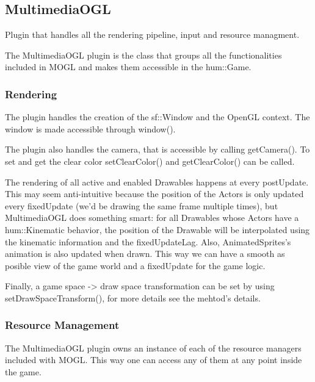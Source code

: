 \subsection{MultimediaOGL}
Plugin that handles all the rendering pipeline, input and resource
managment.

The MultimediaOGL plugin is the class that groups all the functionalities
included in MOGL and makes them accessible in the hum::Game.

\subsubsection{Rendering}

The plugin handles the creation of the sf::Window and the OpenGL context.
The window is made accessible through window().

The plugin also handles the camera, that is accessible by calling getCamera().
To set and get the clear color setClearColor() and getClearColor() can be
called.

The rendering of all active and enabled Drawables happens at every postUpdate.
This may seem anti-intuitive because the position of the Actors is only updated
every fixedUpdate (we'd be drawing the same frame multiple times), but
MultimediaOGL does something smart: for all Drawables whose Actors have a
hum::Kinematic behavior, the position of the Drawable will be interpolated using
the kinematic information and the fixedUpdateLag. Also, AnimatedSprites's animation
is also updated when drawn. This way we can have a smooth as posible view of the
game world and a fixedUpdate for the game logic.

Finally, a game space -> draw space transformation can be set by using
setDrawSpaceTransform(), for more details see the mehtod's details.

\subsubsection{Resource Management}

The MultimediaOGL plugin owns an instance of each of the resource managers
included with MOGL. This way one can access any of them at any point inside the
game.


